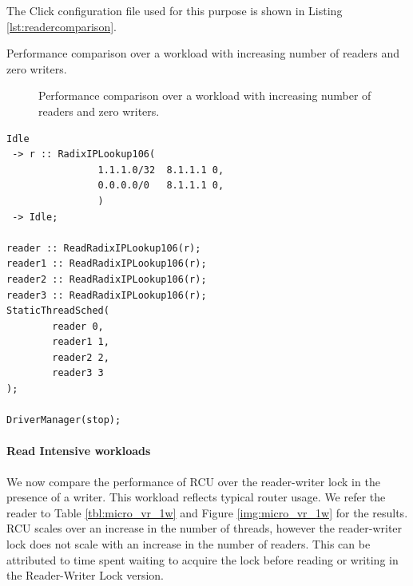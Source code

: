 \documentclass[a4paper,marginparwidth=50pt,marginparsep=10pt]{article}
\begin{document}
The Click configuration file used for this purpose is shown in Listing \ref{lst:readercomparison}.
\begin{table}
\begin{center}

\end{center}
\label{tbl:micro_vr_0w}
\caption{Performance comparison over a workload with increasing number of readers and zero writers.}
\end{table}

\begin{figure}[tph]
\caption{Performance comparison over a workload with increasing number of readers and zero writers.}
\label{img:micro_vr_0w}
\end{figure}

\begin{lstlisting}[float=tph, caption = A Click configuration file for 4 readers, label =lst:readercomparison]
Idle
 -> r :: RadixIPLookup106(
                1.1.1.0/32  8.1.1.1 0,
                0.0.0.0/0   8.1.1.1 0,
                ) 
 -> Idle;

reader :: ReadRadixIPLookup106(r);
reader1 :: ReadRadixIPLookup106(r);
reader2 :: ReadRadixIPLookup106(r);
reader3 :: ReadRadixIPLookup106(r);
StaticThreadSched(
        reader 0,
        reader1 1,
        reader2 2,
        reader3 3
);

DriverManager(stop);

\end{lstlisting}

\paragraph{Read Intensive workloads}
We now compare the performance of RCU over the reader-writer lock in the presence of a writer. This workload reflects typical router usage. We refer the reader to Table \ref{tbl:micro_vr_1w} and Figure \ref{img:micro_vr_1w} for the results.
RCU scales over an increase in the number of threads, however the reader-writer lock does not scale with an increase in the number of readers. This can be attributed to time spent waiting to acquire the lock before reading or writing in the Reader-Writer Lock version.
\end{document}

